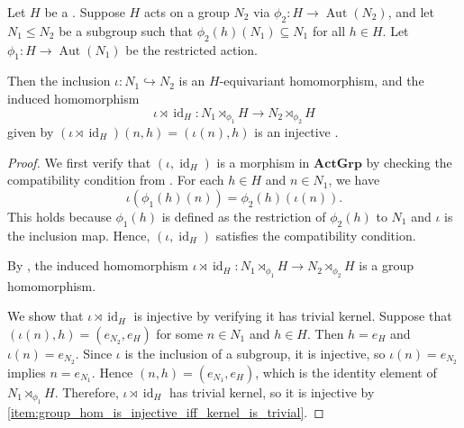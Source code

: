 \begin{corollary} \label{corollary:inclusion_of_H_invariant_subgroup_induces_inclusion_of_semidirect_products}
    Let $H$ be a . Suppose $H$ acts on a group $N_2$ via $\phi_2: H \to \operatorname{Aut}(N_2)$, and let $N_1 \leq N_2$ be a subgroup such that $\phi_2(h)(N_1) \subseteq N_1$ for all $h \in H$. Let $\phi_1: H \to \operatorname{Aut}(N_1)$ be the restricted action.

    Then the inclusion $\iota: N_1 \hookrightarrow N_2$ is an $H$-equivariant homomorphism, and the induced homomorphism
    $$\iota \rtimes \operatorname{id}_H : N_1 \rtimes_{\phi_1} H \longrightarrow N_2 \rtimes_{\phi_2} H$$
    given by $(\iota \rtimes \operatorname{id}_H)(n, h) = (\iota(n), h)$ is an injective .
\end{corollary}
\begin{proof}
    We first verify that $(\iota, \operatorname{id}_H)$ is a morphism in $\mathbf{ActGrp}$ by checking the compatibility condition from . For each $h \in H$ and $n \in N_1$, we have
    $$\iota(\phi_1(h)(n)) = \phi_2(h)(\iota(n)).$$
    This holds because $\phi_1(h)$ is defined as the restriction of $\phi_2(h)$ to $N_1$ and $\iota$ is the inclusion map. Hence, $(\iota, \operatorname{id}_H)$ satisfies the compatibility condition.

    By , the induced homomorphism $\iota \rtimes \operatorname{id}_H : N_1 \rtimes_{\phi_1} H \to N_2 \rtimes_{\phi_2} H$ is a group homomorphism.

    We show that $\iota \rtimes \operatorname{id}_H$ is injective by verifying it has trivial kernel. Suppose that $(\iota(n), h) = (e_{N_2}, e_H)$ for some $n \in N_1$ and $h \in H$. Then $h = e_H$ and $\iota(n) = e_{N_2}$. Since $\iota$ is the inclusion of a subgroup, it is injective, so $\iota(n) = e_{N_2}$ implies $n = e_{N_1}$. Hence $(n, h) = (e_{N_1}, e_H)$, which is the identity element of $N_1 \rtimes_{\phi_1} H$. Therefore, $\iota \rtimes \operatorname{id}_H$ has trivial kernel, so it is injective by \eqref{item:group_hom_is_injective_iff_kernel_is_trivial}.
\end{proof}
